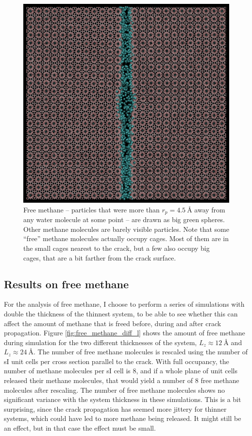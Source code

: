 \begin{figure}
\centering
\includegraphics[width=\textwidth]{../pictures/free_methane.pdf}
\caption{Free methane -- particles that were more than $r_p = \SI{4.5}{\angstrom}$ away from any water molecule at some point -- are drawn as big green spheres. Other methane molecules are barely visible particles. Note that some ``free'' methane molecules actually occupy cages. Most of them are in the small cages nearest to the crack, but a few also occupy big cages, that are a bit farther from the crack surface. }
\label{fig:free_methane}
\end{figure}


\subsection{Results on free methane}
For the analysis of free methane, I choose to perform a series of simulations with double the thickness of the thinnest system, to be able to see whether this can affect the amount of methane that is freed before, during and after crack propagation. Figure \ref{fig:free_methane_diff_l} shows the amount of free methane during simulation for the two different thicknesses of the system, $L_z \approx \SI{12}{\angstrom}$ and $L_z \approx \SI{24}{\angstrom}$. The number of free methane molecules is rescaled using the number of sI unit cells per cross section parallel to the crack. With full occupancy, the number of methane molecules per sI cell is 8, and if a whole plane of unit cells released their methane molecules, that would yield a number of 8 free methane molecules after rescaling. The number of free methane molecules shows no significant variance with the system thickness in these simulations. This is a bit surprising, since the crack propagation has seemed more jittery for thinner systems, which could have led to more methane being released. It might still be an effect, but in that case the effect must be small. 

